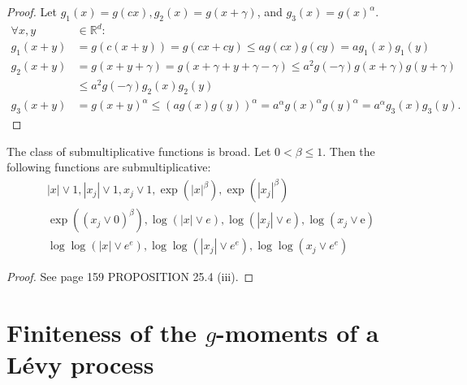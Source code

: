 \documentclass[a4paper,11pt]{article}
\begin{document}
\begin{proof}
    Let $g_{1}(x)=g(c x), g_{2}(x)=g(x+\gamma)$, and $g_{3}(x)=g(x)^{\alpha}$.
    \begin{align}
        \forall x,y & \in \mathbb{R}^{d}:                                                                                                                 \\
        g_{1}(x+y)  & = g(c(x+y)) = g(c x + c y) \leq a g(c x) g(c y) = a g_{1}(x) g_{1}(y)                                                               \\
        g_{2}(x+y)  & = g(x + y + \gamma) = g(x + \gamma + y + \gamma - \gamma)
        \le a^{2} g(-\gamma) g(x+\gamma) g(y + \gamma)                                                                                                    \\
                    & \le a^{2} g(-\gamma) g_{2}( x)g_{2}(y)                                                                                              \\
        g_{3}(x+y)  & = g(x+y) ^{\alpha} \le \left(a g(x) g(y) \right) ^{\alpha}= a^{\alpha} g(x)^{\alpha} g(y)^{\alpha} = a^{\alpha} g_{3}(x) g_{3}(y) .
    \end{align}
\end{proof}

\begin{example}
    The class of submultiplicative functions is broad. Let $0<\beta \leq 1$. Then the following functions are submultiplicative:
    \begin{gather}
        |x| \vee 1, \left|x_{j}\right| \vee 1, x_{j} \vee 1, \exp \left(|x|^{\beta}\right), \exp \left(\left|x_{j}\right|^{\beta}\right) \\
        \exp \left(\left(x_{j} \vee 0\right)^{\beta}\right), \log (|x| \vee e), \log \left(\left|x_{j}\right| \vee e\right), \log \left(x_{j} \vee \mathrm{e}\right) \\
        \log \log \left(|x| \vee e^{e}\right), \log \log \left(\left|x_{j}\right| \vee e^{e}\right), \log \log \left(x_{j} \vee e^{e}\right)
    \end{gather}
\end{example}

\begin{proof}
    See \cite{sato_levy_2013} page 159 PROPOSITION 25.4 (iii).
\end{proof}

\section{Finiteness of the $g$-moments of a L\'{e}vy process}
\end{document}
